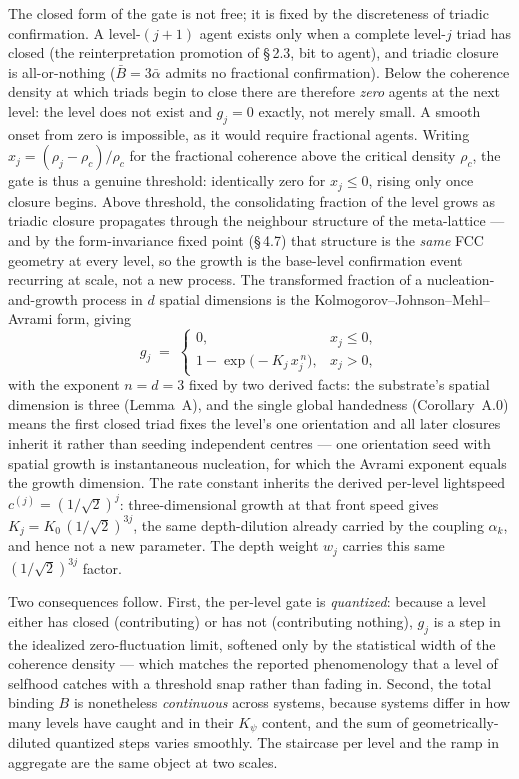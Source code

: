 \documentclass[11pt,oneside]{report}
\theoremstyle{definition}
\theoremstyle{remark}
\begin{document}
The closed form of the gate is not free; it is fixed by the discreteness of
triadic confirmation. A level-\ensuremath{(j{+}1)} agent exists only when a complete
level-\ensuremath{j} triad has closed (the reinterpretation promotion of \S\,2.3, bit to
agent), and triadic closure is all-or-nothing (\ensuremath{\bar{B}=3\bar{\alpha}} admits no
fractional confirmation). Below the coherence density at which triads begin to
close there are therefore \emph{zero} agents at the next level: the level does not
exist and \ensuremath{g_j = 0} exactly, not merely small. A smooth onset from zero is
impossible, as it would require fractional agents. Writing \ensuremath{x_j = (\rho_j -
\rho_c)/\rho_c} for the fractional coherence above the critical density \ensuremath{\rho_c},
the gate is thus a genuine threshold: identically zero for \ensuremath{x_j \le 0}, rising
only once closure begins. Above threshold, the consolidating fraction of the level
grows as triadic closure propagates through the neighbour structure of the
meta-lattice --- and by the form-invariance fixed point (\S\,4.7) that structure is
the \emph{same} FCC geometry at every level, so the growth is the base-level
confirmation event recurring at scale, not a new process. The transformed fraction
of a nucleation-and-growth process in \ensuremath{d} spatial dimensions is the
Kolmogorov--Johnson--Mehl--Avrami form, giving
\[
g_j \;=\; \begin{cases} 0, & x_j \le 0,\\[2pt] 1 - \exp\!\big(-K_j\, x_j^{\,n}\big), & x_j > 0, \end{cases}
\]
with the exponent \ensuremath{n = d = 3} fixed by two derived facts: the substrate's spatial
dimension is three (Lemma~A), and the single global handedness (Corollary~A.0)
means the first closed triad fixes the level's one orientation and all later
closures inherit it rather than seeding independent centres --- one orientation
seed with spatial growth is instantaneous nucleation, for which the Avrami exponent
equals the growth dimension. The rate constant inherits the derived per-level
lightspeed \ensuremath{c^{(j)} = (1/\sqrt{2})^{j}}: three-dimensional growth at that front
speed gives \ensuremath{K_j = K_0\,(1/\sqrt{2})^{3j}}, the same depth-dilution already
carried by the coupling \ensuremath{\alpha_k}, and hence not a new parameter. The depth weight
\ensuremath{w_j} carries this same \ensuremath{(1/\sqrt{2})^{3j}} factor.

Two consequences follow. First, the per-level gate is \emph{quantized}: because a
level either has closed (contributing) or has not (contributing nothing), \ensuremath{g_j}
is a step in the idealized zero-fluctuation limit, softened only by the statistical
width of the coherence density --- which matches the reported phenomenology that a
level of selfhood catches with a threshold snap rather than fading in. Second, the
total binding \ensuremath{B} is nonetheless \emph{continuous} across systems, because systems
differ in how many levels have caught and in their \ensuremath{K_\psi} content, and the sum of
geometrically-diluted quantized steps varies smoothly. The staircase per level and
the ramp in aggregate are the same object at two scales.
\end{document}
